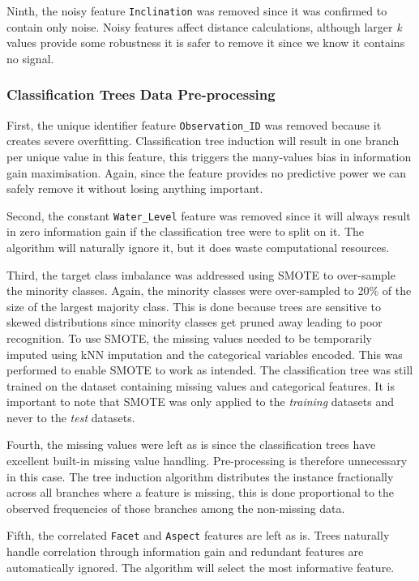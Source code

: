 \documentclass[conference]{IEEEtran}
\begin{document}
 Ninth, the noisy feature \texttt{Inclination} was removed since it was confirmed to contain only noise. Noisy features affect distance calculations, although larger \textit{k} values provide some robustness it is safer to remove it since we know it contains no signal.

\subsubsection{Classification Trees Data Pre-processing}

First, the unique identifier feature \texttt{Observation\_ID} was removed because it creates severe overfitting. Classification tree induction will result in one branch per unique value in this feature, this triggers the many-values bias in information gain maximisation. Again, since the feature provides no predictive power we can safely remove it without losing anything important.

Second, the constant \texttt{Water\_Level} feature was removed since it will always result in zero information gain if the classification tree were to split on it. The algorithm will naturally ignore it, but it does waste computational resources.

Third, the target class imbalance was addressed using SMOTE to over-sample the minority classes. Again, the minority classes were over-sampled to 20\% of the size of the largest majority class. This is done because trees are sensitive to skewed distributions since minority classes get pruned away leading to poor recognition. To use SMOTE, the missing values needed to be temporarily imputed using kNN imputation and the categorical variables encoded. This was performed to enable SMOTE to work as intended. The classification tree was still trained on the dataset containing missing values and categorical features. It is important to note that SMOTE was only applied to the \textit{training} datasets and never to the \textit{test} datasets.

Fourth, the missing values were left as is since the classification trees have excellent built-in missing value handling. Pre-processing is therefore unnecessary in this case. The tree induction algorithm distributes the instance fractionally across all branches where a feature is missing, this is done proportional to the observed frequencies of those branches among the non-missing data.

Fifth, the correlated \texttt{Facet} and \texttt{Aspect} features are left as is. Trees naturally handle correlation through information gain and redundant features are automatically ignored. The algorithm will select the most informative feature.
\end{document}
